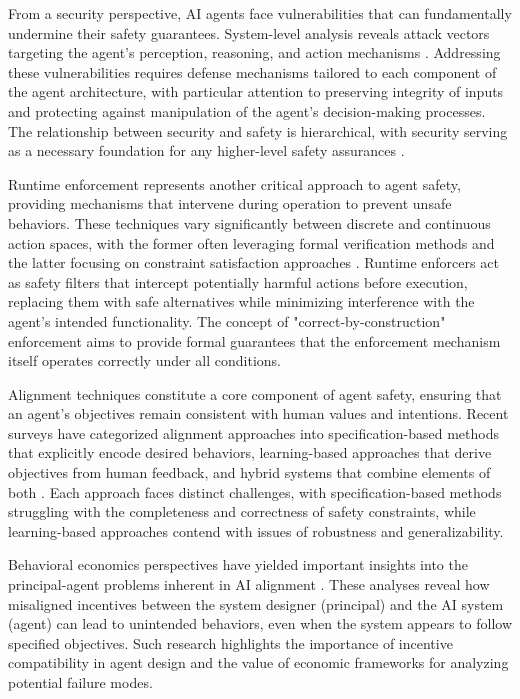 \documentclass[conference]{IEEEtran}
\begin{document}
From a security perspective, AI agents face vulnerabilities that can fundamentally undermine their safety guarantees. System-level analysis reveals attack vectors targeting the agent's perception, reasoning, and action mechanisms \cite{2406.08689}. Addressing these vulnerabilities requires defense mechanisms tailored to each component of the agent architecture, with particular attention to preserving integrity of inputs and protecting against manipulation of the agent's decision-making processes. The relationship between security and safety is hierarchical, with security serving as a necessary foundation for any higher-level safety assurances \cite{2504.16110}.

Runtime enforcement represents another critical approach to agent safety, providing mechanisms that intervene during operation to prevent unsafe behaviors. These techniques vary significantly between discrete and continuous action spaces, with the former often leveraging formal verification methods and the latter focusing on constraint satisfaction approaches \cite{2208.14426}. Runtime enforcers act as safety filters that intercept potentially harmful actions before execution, replacing them with safe alternatives while minimizing interference with the agent's intended functionality. The concept of "correct-by-construction" enforcement aims to provide formal guarantees that the enforcement mechanism itself operates correctly under all conditions.

Alignment techniques constitute a core component of agent safety, ensuring that an agent's objectives remain consistent with human values and intentions. Recent surveys have categorized alignment approaches into specification-based methods that explicitly encode desired behaviors, learning-based approaches that derive objectives from human feedback, and hybrid systems that combine elements of both \cite{2310.19852}. Each approach faces distinct challenges, with specification-based methods struggling with the completeness and correctness of safety constraints, while learning-based approaches contend with issues of robustness and generalizability.

Behavioral economics perspectives have yielded important insights into the principal-agent problems inherent in AI alignment \cite{2307.11137}. These analyses reveal how misaligned incentives between the system designer (principal) and the AI system (agent) can lead to unintended behaviors, even when the system appears to follow specified objectives. Such research highlights the importance of incentive compatibility in agent design and the value of economic frameworks for analyzing potential failure modes.
\end{document}
